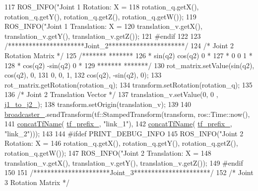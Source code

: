 \begin{DoxyCode}
{{117     ROS\_INFO(\textcolor{stringliteral}{"Joint 1 Rotation: X = %
118              rotation\_q.getX(), rotation\_q.getY(), rotation\_q.getZ(), rotation\_q.getW());
119     ROS\_INFO(\textcolor{stringliteral}{"Joint 1 Translation: X = %
120              translation\_v.getX(), translation\_v.getY(), translation\_v.getZ());
121 \textcolor{preprocessor}{#endif}
122 
123     \textcolor{comment}{/**********************Joint\_2**********************/}
124     \textcolor{comment}{/* Joint 2 Rotation Matrix */}
125     \textcolor{comment}{/*******               *******}
126 \textcolor{comment}{     * sin(q2)    cos(q2)     0  *}
127 \textcolor{comment}{     * 0            0         1  *}
128 \textcolor{comment}{     * cos(q2)   -sin(q2)     0  *}
129 \textcolor{comment}{     *******              *******/}
130     rot\_matrix.setValue(sin(q2), cos(q2), 0,
131                         0, 0, 1,
132                         cos(q2), -sin(q2), 0);
133     rot\_matrix.getRotation(rotation\_q);
134     transform.setRotation(rotation\_q);
135 
136     \textcolor{comment}{/* Joint 2 Translation Vector */}
137     translation\_v.setValue(0, 0 , \hyperlink{classjaco_1_1JacoKinematics_af9545eaea2e16deaaeea5c1e4db27fe2}{j1\_to\_j2\_});
138     transform.setOrigin(translation\_v);
139 
140     \hyperlink{classjaco_1_1JacoKinematics_a3314f9e6a8fb86405384dd23bd194e46}{broadcaster\_}.sendTransform(tf::StampedTransform(transform, ros::Time::now(),
141                                                     \hyperlink{namespacejaco_a6320c11725be13d2957c4e3f474d62f8}{concatTfName}(
      \hyperlink{classjaco_1_1JacoKinematics_a0efb1f0ad1937553c7e285b27da0bdd3}{tf\_prefix\_}, \textcolor{stringliteral}{"link\_1"}),
142                                                     \hyperlink{namespacejaco_a6320c11725be13d2957c4e3f474d62f8}{concatTfName}(
      \hyperlink{classjaco_1_1JacoKinematics_a0efb1f0ad1937553c7e285b27da0bdd3}{tf\_prefix\_}, \textcolor{stringliteral}{"link\_2"})));
143 
144 \textcolor{preprocessor}{#ifdef PRINT\_DEBUG\_INFO}
145     ROS\_INFO(\textcolor{stringliteral}{"Joint 2 Rotation: X = %
146              rotation\_q.getX(), rotation\_q.getY(), rotation\_q.getZ(), rotation\_q.getW());
147     ROS\_INFO(\textcolor{stringliteral}{"Joint 2 Translation: X = %
148              translation\_v.getX(), translation\_v.getY(), translation\_v.getZ());
149 \textcolor{preprocessor}{#endif}
150 
151     \textcolor{comment}{/**********************Joint\_3**********************/}
152     \textcolor{comment}{/* Joint 3 Rotation Matrix */}
}}}}}}
\end{DoxyCode}
